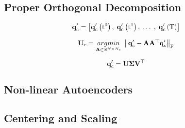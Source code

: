 \subsection{Proper Orthogonal Decomposition}

\begin{equation}
	\consDataMatUns = \left[ \consFuncUns{\initTime}, \; \consFuncUns{\timeVar^1}, \; \hdots \; , \; \consFuncUns{\finalTime} \right]
\end{equation}

\begin{equation}\label{eq:podL2Min}
    \consTrial = \argmin{\dummyMatOne \inRTwo{\numDOF}{\numConsModes}} \norm{ \consDataMatUns - \dummyMatOne \dummyMatOne^\top \consDataMatUns }_\text{F}
\end{equation}

\begin{equation}\label{eq:svd}
    \consDataMatUns = \basisMat \singVecMat \rightSingVecMat^\top
\end{equation}

\subsection{Non-linear Autoencoders}\label{subsec:nonlinManifold}

\subsection{Centering and Scaling}\label{subsec:centerScale}